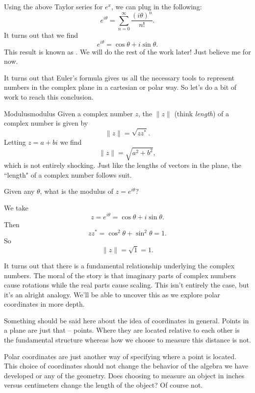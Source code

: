         Using the above Taylor series for $e^x$, we can plug in the following:
        \[
        e^{i\theta}=\sum_{n=0}^\infty \frac{(i\theta)^n}{n!}.
        \]
        It turns out that we find
        \[
        e^{i\theta} = \cos \theta + i \sin \theta.
        \]
        This result is known as . We will do the rest of the work later! Just believe me for now.
        
        It turns out that Euler's formula gives us all the necessary tools to represent numbers in the complex plane in a cartesian or polar way.  So let's do a bit of work to reach this conclusion.
        
        \begin{df}{Modulus}{modulus}
        Given a complex number $z$, the  $\|z\|$ (think \emph{length}) of a complex number is given by
        \[
        \|z\|=\sqrt{zz^*}.
        \]
        Letting $z=a+bi$ we find
        \[
        \|z\|=\sqrt{a^2+b^2},
        \]
        which is not entirely shocking.  Just like the lengths of vectors in the plane, the ``length" of a complex number follows suit.
        \end{df}
        
        \begin{question}
                Given any $\theta$, what is the modulus of $z=e^{i\theta}$?
        \end{question}
        
        \begin{answer}
        We take
        \[
        z=e^{i\theta}=\cos \theta + i \sin \theta.
        \]
        Then
        \[
        zz^*=\cos^2 \theta + \sin^2 \theta = 1.
        \]
        So
        \[
        \|z\|=\sqrt{1}=1.
        \]
        \end{answer}
        
        It turns out that there is a fundamental relationship underlying the complex numbers.  The moral of the story is that imaginary parts of complex numbers cause rotations while the real parts cause scaling. This isn't entirely the case, but it's an alright analogy. We'll be able to uncover this as we explore polar coordinates in more depth.
        
        \begin{remark}
        Something should be said here about the idea of coordinates in general.  Points in a plane are just that -- points.  Where they are located relative to each other is the fundamental structure whereas how we choose to measure this distance is not.  
        
        Polar coordinates are just another way of specifying where a point is located.  This choice of coordinates should not change the behavior of the algebra we have developed or any of the geometry.  Does choosing to measure an object in inches versus centimeters change the length of the object? Of course not.
        \end{remark}
        
